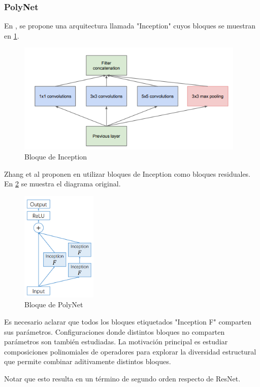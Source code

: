 \documentclass[titlepage,a4paper,oneside]{article}
\begin{document}
\subsubsection{PolyNet}
En \cite{szegedy2014going}, se propone una arquitectura llamada "Inception" cuyos bloques se muestran en \ref{inception_block}.

\begin{figure}[H]
\centering
\includegraphics[height=200px]{images/inception_block.png}
\caption{Bloque de Inception}
\label{inception_block}
\end{figure}

Zhang et al proponen en \cite{zhang2017polynet} utilizar bloques de Inception como bloques residuales. En \ref{polynet_block} se muestra el diagrama original.

\begin{figure}[H]
\centering
\includegraphics[height=200px]{images/polynet.png}
\caption{Bloque de PolyNet}
\label{polynet_block}
\end{figure}

Es necesario aclarar que todos los bloques etiquetados "Inception F" comparten sus parámetros. Configuraciones donde distintos bloques no comparten parámetros son también estudiadas. La motivación principal es estudiar composiciones polinomiales de operadores para explorar la diversidad estructural que permite combinar aditivamente distintos bloques.

Notar que esto resulta en un término de segundo orden respecto de ResNet.
\end{document}
